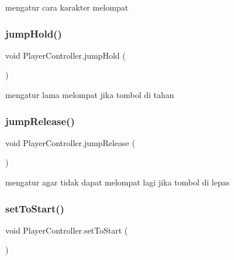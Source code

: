 mengatur cara karakter melompat 

\hypertarget{class_player_controller_afd5b28f0a9018e11fc879c93107c7a37}{}\label{class_player_controller_afd5b28f0a9018e11fc879c93107c7a37} 
\subsubsection{\texorpdfstring{jump\+Hold()}{jumpHold()}}
{\footnotesize\ttfamily void Player\+Controller.\+jump\+Hold (\begin{DoxyParamCaption}{ }\end{DoxyParamCaption})\hspace{0.3cm}{\ttfamily [private]}}



mengatur lama melompat jika tombol di tahan 

\hypertarget{class_player_controller_af65ea7266683911055939bfad8c4248b}{}\label{class_player_controller_af65ea7266683911055939bfad8c4248b} 
\subsubsection{\texorpdfstring{jump\+Release()}{jumpRelease()}}
{\footnotesize\ttfamily void Player\+Controller.\+jump\+Release (\begin{DoxyParamCaption}{ }\end{DoxyParamCaption})\hspace{0.3cm}{\ttfamily [private]}}



mengatur agar tidak dapat melompat lagi jika tombol di lepas 

\hypertarget{class_player_controller_adb52e7f8ab39c74e1922393d5015a70a}{}\label{class_player_controller_adb52e7f8ab39c74e1922393d5015a70a} 
\subsubsection{\texorpdfstring{set\+To\+Start()}{setToStart()}}
{\footnotesize\ttfamily void Player\+Controller.\+set\+To\+Start (\begin{DoxyParamCaption}{ }\end{DoxyParamCaption})}



